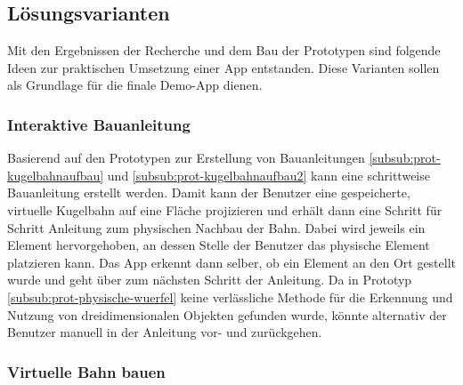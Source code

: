 







\subsection{Lösungsvarianten}\label{sub:loesungsvarianten}

Mit den Ergebnissen der Recherche und dem Bau der Prototypen sind folgende Ideen zur praktischen Umsetzung einer App entstanden.
Diese Varianten sollen als Grundlage für die finale Demo-App dienen.

\subsubsection{Interaktive Bauanleitung}\label{subsub:loesung-bauanleitung}

Basierend auf den Prototypen zur Erstellung von Bauanleitungen \ref{subsub:prot-kugelbahnaufbau} und \ref{subsub:prot-kugelbahnaufbau2} kann eine schrittweise Bauanleitung erstellt werden.
Damit kann der Benutzer eine gespeicherte, virtuelle Kugelbahn auf eine Fläche projizieren und erhält dann eine Schritt für Schritt Anleitung zum physischen Nachbau der Bahn.
Dabei wird jeweils ein Element hervorgehoben, an dessen Stelle der Benutzer das physische Element platzieren kann.
Das App erkennt dann selber, ob ein Element an den Ort gestellt wurde und geht über zum nächsten Schritt der Anleitung.
Da in Prototyp \ref{subsub:prot-physische-wuerfel} keine verlässliche Methode für die Erkennung und Nutzung von dreidimensionalen Objekten gefunden wurde, könnte alternativ der Benutzer manuell in der Anleitung vor- und zurückgehen.

\subsubsection{Virtuelle Bahn bauen}\label{subsub:loesung-virtuelle-bahn}


